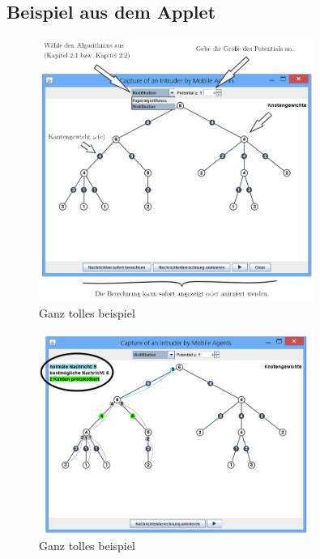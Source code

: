 \subsection{Beispiel aus dem Applet}


\begin{figure}[hb]
	\includegraphics[width=0.8\textwidth]{bilder/abb_erklaerung1.png} 
	\captionsetup{width=0.8\textwidth}
	\caption{Ganz tolles beispiel}
	\label{abb_erklaerung1}
\end{figure}
\begin{figure}[hb]
	\includegraphics[width=0.8\textwidth]{bilder/abb_erklaerung2.png} 
	\captionsetup{width=0.8\textwidth}
	\caption{Ganz tolles beispiel}
	\label{abb_erklaerung1}
\end{figure}
